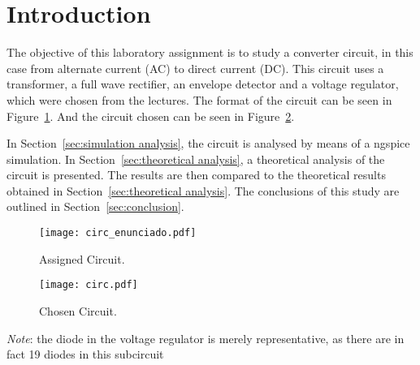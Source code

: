 \section{Introduction}
\label{sec:introduction}

The objective of this laboratory assignment is to study a converter circuit, in this case from alternate current (AC) to direct current (DC).
This circuit uses a transformer, a full wave rectifier, an envelope detector and a voltage regulator, which were chosen from the lectures.
The format of the circuit can be seen in Figure~\ref{fig:format}. And the circuit chosen can be seen in Figure~\ref{fig:circuit}.

In Section~\ref{sec:simulation analysis}, the circuit is analysed by
means of a ngspice simulation. In Section~\ref{sec:theoretical analysis}, a theoretical analysis of the circuit is
presented. The results are then compared to the theoretical results obtained in
Section~\ref{sec:theoretical analysis}. The conclusions of this study are outlined in
Section~\ref{sec:conclusion}.



\begin{figure}[h!] \centering
	\texttt{[image: circ\_enunciado.pdf]}
	\caption{Assigned Circuit.}
	\label{fig:format}
\end{figure}

\begin{figure}[h!] \centering
	\texttt{[image: circ.pdf]}
	\caption{Chosen Circuit.}
	\label{fig:circuit}
\end{figure}

\emph{Note}: the diode in the voltage regulator is merely representative, as there are in fact 19 diodes in this subcircuit

